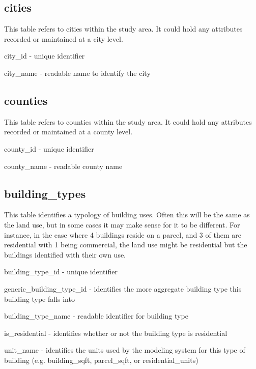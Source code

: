 \subsection{cities} 

This table refers to cities within the study area. It could hold any attributes recorded or maintained at a city level.

\begin{description}
\item city\_id - unique identifier
\item city\_name - readable name to identify the city 
\end{description}

\subsection{counties} 

This table refers to counties within the study area. It could hold any attributes recorded or maintained at a county level.

\begin{description}
\item county\_id - unique identifier
\item county\_name - readable county name
\end{description}

\subsection{building\_types} 

This table identifies a typology of building uses. Often this will be the same as the land use, but in some cases it may make sense for it to be different. For instance, in the case where 4 buildings reside on a parcel, and 3 of them are residential with 1 being commercial, the land use might be residential but the buildings identified with their own use.

\begin{description}
\item building\_type\_id - unique identifier
\item generic\_building\_type\_id - identifies the more aggregate building type this building type falls into
\item building\_type\_name - readable identifier for building type
\item is\_residential - identifies whether or not the building type is residential
\item unit\_name - identifies the units used by the modeling system for this type of building (e.g. building\_sqft, parcel\_sqft, or residential\_units) 
\end{description}

